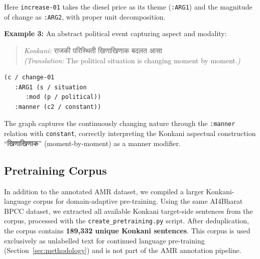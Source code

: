 Here \texttt{increase-01} takes the diesel price as its theme (\texttt{:ARG1}) and the magnitude of change as \texttt{:ARG2}, with proper unit decomposition.

\textbf{Example 3:} An abstract political event capturing aspect and modality:

\begin{quote}
\textit{Konkani:} राजकी परिस्थिती खिणाखिणाक बदलत आसा \\
\textit{(Translation:} The political situation is changing moment by moment.\textit{)}
\end{quote}

\begin{verbatim}
(c / change-01
   :ARG1 (s / situation
      :mod (p / political))
   :manner (c2 / constant))
\end{verbatim}

The graph captures the continuously changing nature through the \texttt{:manner} relation with \texttt{constant}, correctly interpreting the Konkani aspectual construction ``खिणाखिणाक'' (moment-by-moment) as a manner modifier.

\subsection{Pretraining Corpus}

In addition to the annotated AMR dataset, we compiled a larger Konkani-language corpus for domain-adaptive pre-training. Using the same AI4Bharat BPCC dataset, we extracted all available Konkani target-side sentences from the corpus, processed with the \texttt{create\_pretraining.py} script. After deduplication, the corpus contains \textbf{189,332 unique Konkani sentences}. This corpus is used exclusively as unlabelled text for continued language pre-training (Section~\ref{sec:methodology}) and is not part of the AMR annotation pipeline.

